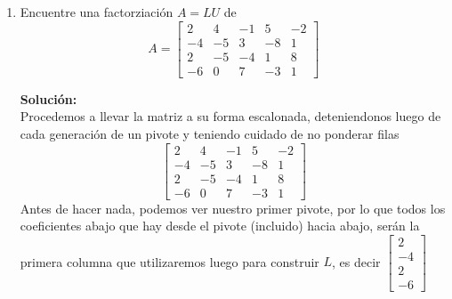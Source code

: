 \documentclass[12pt]{article}
\newenvironment{solucion}
{\begin{mdframed}[backgroundcolor=black!10]
		{\bf Solución:}\\
	}
	{
	\end{mdframed}
}
\newenvironment{preguntas}
{\begin{enumerate}\itemsep12pt
	}
	{
	\end{enumerate}
}
\newcommand{\R}{\mathbb{R}}
\newcommand{\widesim}[2][1.5]{
	\mathrel{\overset{#2}{\scalebox{#1}[1]{$\sim$}}}
}
\newcommand{\wsim}{\widesim{}}
\begin{document}
\begin{preguntas}
\begin{solucion}
\begin{enumerate}[a)]
			
			Finalmente, $\{v_1, v_2, v_4\}$ es L.I., por lo que la afirmación es {\bf Verdadera}.
\item Si $A$ es una matriz de $3\times 5$ y $T$ es la transformación lineal definida por $T(x) = Ax$, entonces $T$ tiene dominio $\R^3$.\\
			\\
			$x$ debe tener tantas filas como columnas tiene $A$, es decir 5, por lo que el dominio de $T$ es $\R^5$.
			
			Entonces, la afirmación es {\bf Falsa}.
\item Un sistema con más ecuaciones que incógnitas es siempre consistente.\\
			\\
			Intentemos buscar un caso donde no se cumpla esto.
			$$\begin{array}{rcl}
			x + y & = & 1 \\
			y & = & 1 \\
			y & = & 2
			\end{array} \Longrightarrow
			\begin{bmatrix}
			1 & 1 & 1\\
			0 & 1 & 1\\
			0 & 1 & 2
			\end{bmatrix} \wsim 
			\begin{bmatrix}
			1 & 1 & 1\\
			0 & 1 & 1\\
			0 & 0 & 1
			\end{bmatrix}$$
			Este sistema es claramente inconsistente.
			
			Entonces, la afirmación es {\bf Falsa}.
\end{enumerate}
\end{solucion}
\item Encuentre una factorziación $A = LU$ de
	$$A = \begin{bmatrix}
	2 & 4 & -1 & 5 & -2 \\
	-4 & -5 & 3 & -8 & 1 \\
	2 & -5 & -4 & 1 & 8 \\
	-6 & 0 & 7 & -3 & 1
	\end{bmatrix}$$
\begin{solucion}
Procedemos a llevar la matriz a su forma escalonada, deteniendonos luego de cada generación de un pivote y teniendo cuidado de no ponderar filas
		$$\begin{bmatrix}
		2 & 4 & -1 & 5 & -2 \\
		-4 & -5 & 3 & -8 & 1 \\
		2 & -5 & -4 & 1 & 8 \\
		-6 & 0 & 7 & -3 & 1
		\end{bmatrix}$$
		Antes de hacer nada, podemos ver nuestro primer pivote, por lo que todos los coeficientes abajo que hay desde el pivote (incluido) hacia abajo, serán la primera columna que utilizaremos luego para construir $L$, es decir $\begin{bmatrix} 2\\-4\\2\\-6\end{bmatrix}$
		

\end{solucion}
\end{preguntas}
\end{document}
